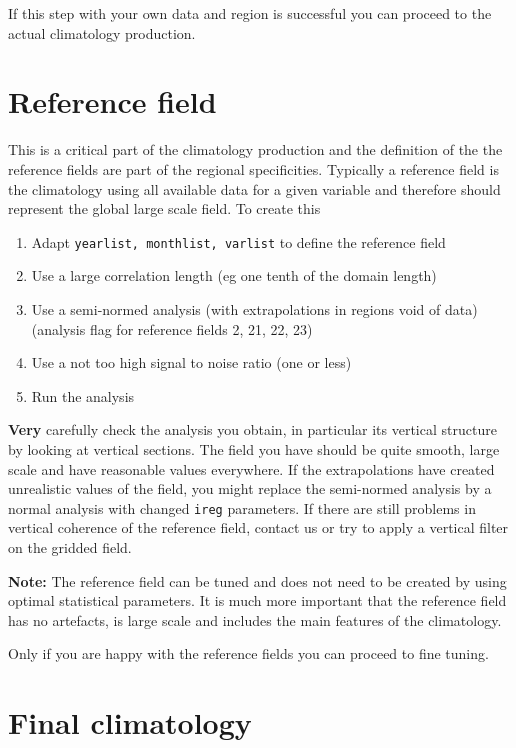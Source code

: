 \documentclass[8pt,a4paper,notitlepage]{book}
\begin{document}
If this step with your own data and region is successful you can proceed to the actual climatology production.  


\section{Reference field}
This is a critical part of the climatology production and the definition of the the reference fields are part of the regional specificities. Typically a reference field is the climatology using all available data for a given variable and therefore should represent the global large scale field. To create this

\begin{enumerate}
\item Adapt {\tt yearlist, monthlist, varlist} to define the reference field
\item Use a large correlation length (eg one tenth of the domain length)
\item Use a semi-normed analysis (with extrapolations in regions void of data) (analysis flag for reference fields 2, 21, 22, 23)
\item Use a not too high signal to noise ratio (one or less)
\item Run the analysis
\end{enumerate}
{\bf Very} carefully check the analysis you obtain, in particular its vertical structure by looking at vertical sections. The field you have should be quite smooth, large scale and have reasonable values everywhere. If the extrapolations have created unrealistic values of the field, you might replace the semi-normed analysis by a normal analysis with changed {\tt ireg} parameters. If there are still problems in vertical coherence of the reference field, contact us or try to apply a vertical filter on the gridded field.

{\bf Note:} The reference field can be tuned and does not need to be created by using optimal statistical parameters. It is much more important that the reference field has no artefacts, is large scale and includes the main features of the climatology.


Only if you are happy with the reference fields you can proceed to fine tuning.

\section{Final climatology}
\end{document}
